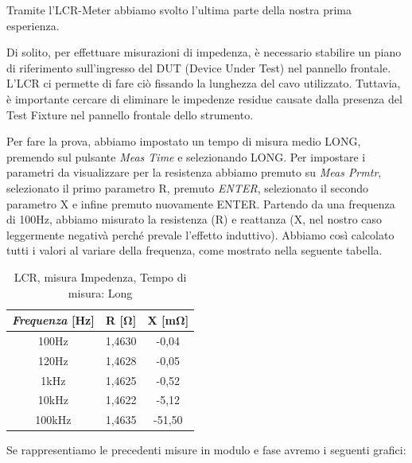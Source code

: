 Tramite l'LCR-Meter abbiamo svolto l'ultima parte della nostra prima esperienza.

Di solito, per effettuare misurazioni di impedenza, è necessario stabilire un piano di riferimento sull'ingresso del DUT (Device Under Test) nel pannello frontale. L'LCR ci permette di fare ciò fissando la lunghezza del cavo utilizzato. Tuttavia, è importante cercare di eliminare le impedenze residue causate dalla presenza del Test Fixture nel pannello frontale dello strumento.

Per fare la prova, abbiamo impostato un tempo di misura medio LONG, premendo sul pulsante \emph{Meas Time} e selezionando LONG.
Per impostare i parametri da visualizzare per la resistenza abbiamo premuto su \emph{Meas Prmtr}, selezionato il primo parametro R, premuto \emph{ENTER}, selezionato il secondo parametro X e infine premuto nuovamente ENTER.
Partendo da una frequenza di 100Hz, abbiamo misurato la resistenza (R) e reattanza (X, nel nostro caso leggermente negativà perché prevale l'effetto induttivo). Abbiamo così calcolato tutti i valori al variare della frequenza, come mostrato nella seguente tabella.  


\begin{table}[!ht]
\centering
\begin{tabular}{|c|c|c|}
\hline
\textit{\textbf{Frequenza}} \textbf{[Hz]} & \textbf{R [$\bm{\Omega}$]}  & \textbf{X [m$\bm{\Omega}$]}  \\ \hline
100Hz                       & 1,4630    & -0,04      \\ \hline
120Hz                       & 1,4628    & -0,05      \\ \hline
1kHz                        & 1,4625    & -0,52      \\ \hline
10kHz                       & 1,4622    & -5,12      \\ \hline
100kHz                      & 1,4635    & -51,50     \\ \hline
\end{tabular}
\caption{LCR, misura Impedenza, Tempo di misura: Long}
\label{tab:lcr_z}
\end{table}
\FloatBarrier


Se rappresentiamo le precedenti misure in modulo e fase avremo i seguenti grafici:
%

